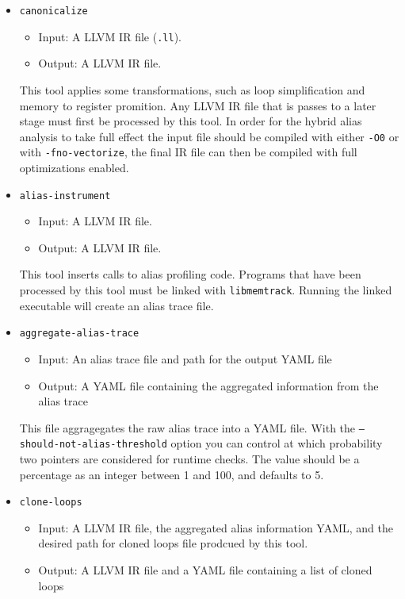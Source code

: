 \documentclass{article}
\begin{document}
\begin{itemize}
	\item \texttt{canonicalize}\\
		\begin{itemize}
			\item Input:   A LLVM IR file (\texttt{.ll}).
			\item Output:  A LLVM IR file.
		\end{itemize}
		This tool applies some transformations, such as loop simplification and memory to register promition.
		Any LLVM IR file that is passes to a later stage must first be processed by this tool.
		In order for the hybrid alias analysis to take full effect the input file should be compiled with either \texttt{-O0} or with \texttt{-fno-vectorize}, the final IR file can then be compiled with full optimizations enabled.
	\item \texttt{alias-instrument}\\
		\begin{itemize}
			\item Input:   A LLVM IR file.
			\item Output:  A LLVM IR file.
		\end{itemize}
		This tool inserts calls to alias profiling code. Programs that have been processed by this tool must be linked with \texttt{libmemtrack}.
		Running the linked executable will create an alias trace file.
	\item \texttt{aggregate-alias-trace}\\
		\begin{itemize}
			\item Input:   An alias trace file and path for the output YAML file
			\item Output:  A YAML file containing the aggregated information from the alias trace
		\end{itemize}
		This file aggragegates the raw alias trace into a YAML file.
		With the \texttt{--should-not-alias-threshold} option you can control at which probability two pointers are considered for runtime checks. The value should be a percentage as an integer between 1 and 100, and defaults to 5.
	\item \texttt{clone-loops}\\
		\begin{itemize}
			\item Input:   A LLVM IR file, the aggregated alias information YAML, and the desired path for cloned loops file prodcued by this tool.
			\item Output:  A LLVM IR file and a YAML file containing a list of cloned loops

\end{itemize}
\end{itemize}
\end{document}
